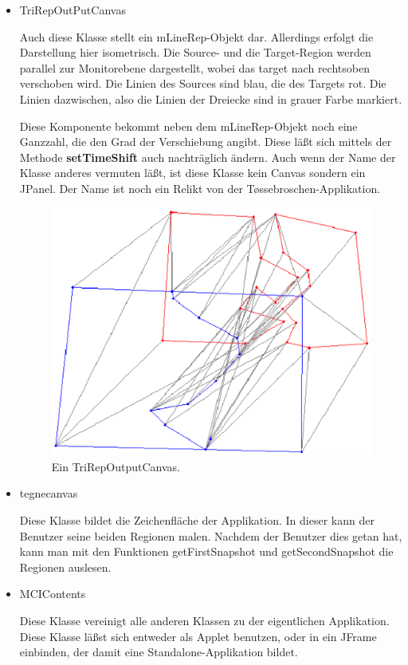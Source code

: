 \begin{itemize}
\item TriRepOutPutCanvas

Auch diese Klasse stellt ein mLineRep-Objekt dar. Allerdings erfolgt die Darstellung hier isometrisch. Die Source- und die Target-Region werden parallel zur Monitorebene dargestellt, wobei das target nach rechtsoben verschoben wird. Die Linien des Sources sind blau, die des Targets rot. Die Linien dazwischen, also die Linien der Dreiecke sind in grauer Farbe markiert.

Diese Komponente bekommt neben dem mLineRep-Objekt noch eine Ganzzahl, die den Grad der Verschiebung angibt. Diese läßt sich mittels der Methode \textbf{setTimeShift} auch nachträglich ändern. Auch wenn der Name der Klasse anderes vermuten läßt, ist diese Klasse kein Canvas sondern ein JPanel. Der Name ist noch ein Relikt von der T\o{}ssebroschen-Applikation.

\begin{figure}
	\centering
	\includegraphics[scale=0.7]{TriRepOutPutCanvas.eps}
	\caption{Ein TriRepOutputCanvas.}
	\label{fig:TriRepOutputCanvas}
\end{figure}




\item tegnecanvas

Diese Klasse bildet die Zeichenfläche der Applikation. In dieser kann der Benutzer seine beiden Regionen malen. Nachdem der Benutzer dies getan hat, kann man mit den Funktionen getFirstSnapshot und getSecondSnapshot die Regionen auslesen. 

\item MCIContents

Diese Klasse vereinigt alle anderen Klassen zu der eigentlichen Applikation. Diese Klasse läßst sich entweder als Applet benutzen, oder in ein JFrame einbinden, der damit eine Standalone-Applikation bildet.
\end{itemize}
